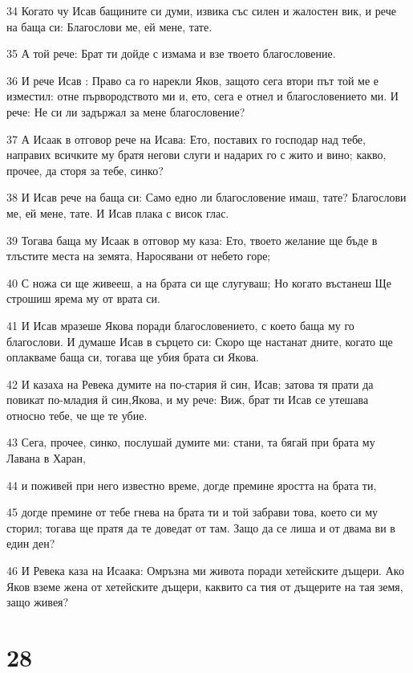 \par 34 Когато чу Исав бащините си думи, извика със силен и жалостен вик, и рече на баща си: Благослови ме, ей мене, тате.
\par 35 А той рече: Брат ти дойде с измама и взе твоето благословение.
\par 36 И рече Исав : Право са го нарекли Яков, защото сега втори път той ме е изместил: отне първородството ми и, ето, сега е отнел и благословението ми. И рече: Не си ли задържал за мене благословение?
\par 37 А Исаак в отговор рече на Исава: Ето, поставих го господар над тебе, направих всичките му братя негови слуги и надарих го с жито и вино; какво, прочее, да сторя за тебе, синко?
\par 38 И Исав рече на баща си: Само едно ли благословение имаш, тате? Благослови ме, ей мене, тате. И Исав плака с висок глас.
\par 39 Тогава баща му Исаак в отговор му каза: Ето, твоето желание ще бъде в тлъстите места на земята, Наросявани от небето горе;
\par 40 С ножа си ще живееш, а на брата си ще слугуваш; Но когато въстанеш Ще строшиш ярема му от врата си.
\par 41 И Исав мразеше Якова поради благословението, с което баща му го благослови. И думаше Исав в сърцето си: Скоро ще настанат дните, когато ще оплакваме баща си, тогава ще убия брата си Якова.
\par 42 И казаха на Ревека думите на по-стария й син, Исав; затова тя прати да повикат по-младия й син,Якова, и му рече: Виж, брат ти Исав се утешава относно тебе, че ще те убие.
\par 43 Сега, прочее, синко, послушай думите ми: стани, та бягай при брата му Лавана в Харан,
\par 44 и поживей при него известно време, догде премине яростта на брата ти,
\par 45 догде премине от тебе гнева на брата ти и той забрави това, което си му сторил; тогава ще пратя да те доведат от там. Защо да се лиша и от двама ви в един ден?
\par 46 И Ревека каза на Исаака: Омръзна ми живота поради хетейските дъщери. Ако Яков вземе жена от хетейските дъщери, каквито са тия от дъщерите на тая земя, защо живея?

\chapter{28}

